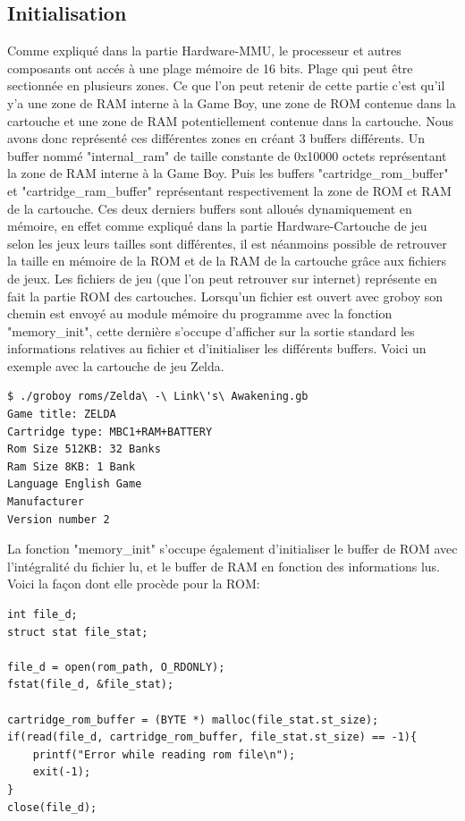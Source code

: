\documentclass{report}
\begin{document}
\subsection{Initialisation} 
Comme expliqué dans la partie Hardware-MMU, le processeur et autres composants ont accés à une plage mémoire de 16 bits. Plage qui peut être sectionnée en plusieurs zones. Ce que l'on peut retenir de cette partie c'est qu'il y'a une zone de RAM interne à la Game Boy, une zone de ROM contenue dans la cartouche et une zone de RAM potentiellement contenue dans la cartouche. Nous avons donc représenté ces différentes zones en créant 3 buffers différents. Un buffer nommé "internal\_ram" de taille constante de 0x10000 octets représentant la zone de RAM interne à la Game Boy. Puis les buffers "cartridge\_rom\_buffer" et "cartridge\_ram\_buffer" représentant respectivement la zone de ROM et RAM de la cartouche.
Ces deux derniers buffers sont alloués dynamiquement en mémoire, en effet comme expliqué dans la partie Hardware-Cartouche de jeu selon les jeux leurs tailles sont différentes, il est néanmoins possible de retrouver la taille en mémoire de la ROM et de la RAM de la cartouche grâce aux fichiers de jeux.
Les fichiers de jeu (que l'on peut retrouver sur internet) représente en fait la partie ROM des cartouches.
Lorsqu'un fichier est ouvert avec groboy son chemin est envoyé au module mémoire du programme avec la fonction "memory\_init", cette dernière s'occupe d'afficher sur la sortie standard les informations relatives au fichier et d'initialiser les différents buffers. Voici un exemple avec la cartouche de jeu Zelda.
\begin{lstlisting}
$ ./groboy roms/Zelda\ -\ Link\'s\ Awakening.gb
Game title: ZELDA
Cartridge type: MBC1+RAM+BATTERY
Rom Size 512KB: 32 Banks
Ram Size 8KB: 1 Bank
Language English Game
Manufacturer
Version number 2
\end{lstlisting}
La fonction "memory\_init" s'occupe également d'initialiser le buffer de ROM avec l'intégralité du fichier lu, et le buffer de RAM en fonction des informations lus.
Voici la façon dont elle procède pour la ROM:
\begin{lstlisting}
int file_d;
struct stat file_stat;

file_d = open(rom_path, O_RDONLY);
fstat(file_d, &file_stat);

cartridge_rom_buffer = (BYTE *) malloc(file_stat.st_size);
if(read(file_d, cartridge_rom_buffer, file_stat.st_size) == -1){
	printf("Error while reading rom file\n");
	exit(-1);
}    
close(file_d);
\end{lstlisting}
\end{document}

